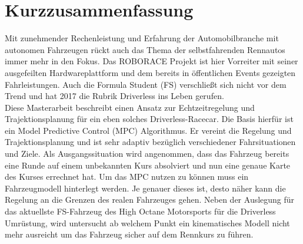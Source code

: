 
\chapter*{Kurzzusammenfassung}

Mit zunehmender Rechenleistung und Erfahrung der Automobilbranche mit autonomen Fahrzeugen rückt auch das Thema der selbstfahrenden Rennautos immer mehr in den Fokus. Das ROBORACE Projekt ist hier Vorreiter mit seiner ausgefeilten Hardwareplattform und dem bereits in öffentlichen Events gezeigten Fahrleistungen. Auch die Formula Student (FS) verschließt sich nicht vor dem Trend und hat 2017 die Rubrik Driverless ins Leben gerufen. \\
Diese Masterarbeit beschreibt einen Ansatz zur Echtzeitregelung und Trajektionsplanung für ein eben solches Driverless-Racecar. Die Basis hierfür ist ein Model Predictive Control (MPC) Algorithmus. Er vereint die Regelung und Trajektionsplanung und ist sehr adaptiv bezüglich verschiedener Fahrsituationen und Ziele.
Als Ausgangssituation wird angenommen, dass das Fahrzeug bereits eine Runde auf einem unbekannten Kurs absolviert und nun eine genaue Karte des Kurses errechnet hat. 
Um das MPC nutzen zu können muss ein Fahrzeugmodell hinterlegt werden. Je genauer dieses ist, desto näher kann die Regelung an die Grenzen des realen Fahrzeuges gehen. Neben der Auslegung für das aktuellste FS-Fahrzeug des High Octane Motorsports für die Driverless Umrüstung, wird untersucht ab welchem Punkt ein kinematisches Modell nicht mehr ausreicht um das Fahrzeug sicher auf dem Rennkurs zu führen.


